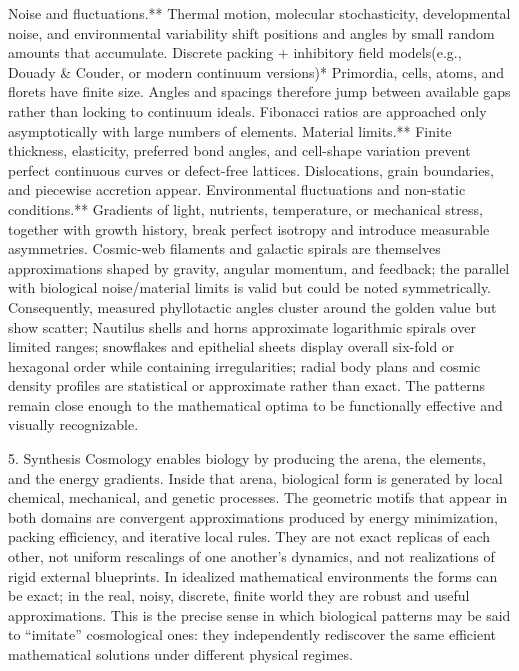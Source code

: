 Noise and fluctuations.** Thermal motion, molecular stochasticity, developmental noise, and environmental variability shift positions and angles by small random amounts that accumulate.
Discrete packing + inhibitory field models(e.g., Douady & Couder, or modern continuum versions)* Primordia, cells, atoms, and florets have finite size. Angles and spacings therefore jump between available gaps rather than locking to continuum ideals. Fibonacci ratios are approached only asymptotically with large numbers of elements.
Material limits.** Finite thickness, elasticity, preferred bond angles, and cell-shape variation prevent perfect continuous curves or defect-free lattices. Dislocations, grain boundaries, and piecewise accretion appear.
Environmental fluctuations and non-static conditions.** Gradients of light, nutrients, temperature, or mechanical stress, together with growth history, break perfect isotropy and introduce measurable asymmetries.
Cosmic-web filaments and galactic spirals are themselves approximations shaped by gravity, angular momentum, and feedback; the parallel with biological noise/material limits is valid but could be noted symmetrically.
Consequently, measured phyllotactic angles cluster around the golden value but show scatter; Nautilus shells and horns approximate logarithmic spirals over limited ranges; snowflakes and epithelial sheets display overall six-fold or hexagonal order while containing irregularities; radial body plans and cosmic density profiles are statistical or approximate rather than exact. The patterns remain close enough to the mathematical optima to be functionally effective and visually recognizable.

5. Synthesis
Cosmology enables biology by producing the arena, the elements, and the energy gradients. Inside that arena, biological form is generated by local chemical, mechanical, and genetic processes. The geometric motifs that appear in both domains are convergent approximations produced by energy minimization, packing efficiency, and iterative local rules. They are not exact replicas of each other, not uniform rescalings of one another’s dynamics, and not realizations of rigid external blueprints. In idealized mathematical environments the forms can be exact; in the real, noisy, discrete, finite world they are robust and useful approximations. This is the precise sense in which biological patterns may be said to “imitate” cosmological ones: they independently rediscover the same efficient mathematical solutions under different physical regimes.

